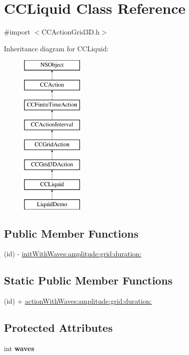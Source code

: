 \hypertarget{interface_c_c_liquid}{\section{C\-C\-Liquid Class Reference}
\label{interface_c_c_liquid}
}


{\ttfamily \#import $<$C\-C\-Action\-Grid3\-D.\-h$>$}

Inheritance diagram for C\-C\-Liquid\-:\begin{figure}[H]
\begin{center}
\leavevmode
\includegraphics[height=8.000000cm]{interface_c_c_liquid}
\end{center}
\end{figure}
\subsection*{Public Member Functions}
\begin{DoxyCompactItemize}
\item 
(id) -\/ \hyperlink{interface_c_c_liquid_abd0bc7dcac068176fbb300d269e060e2}{init\-With\-Waves\-:amplitude\-:grid\-:duration\-:}
\end{DoxyCompactItemize}
\subsection*{Static Public Member Functions}
\begin{DoxyCompactItemize}
\item 
(id) + \hyperlink{interface_c_c_liquid_a5a70692a57ff138f24bdac85ab4484a2}{action\-With\-Waves\-:amplitude\-:grid\-:duration\-:}
\end{DoxyCompactItemize}
\subsection*{Protected Attributes}
\begin{DoxyCompactItemize}
\item 
\hypertarget{interface_c_c_liquid_a9724b0954da3c55a270eada96d16f889}{int {\bfseries waves}}\label{interface_c_c_liquid_a9724b0954da3c55a270eada96d16f889}

\end{DoxyCompactItemize}
